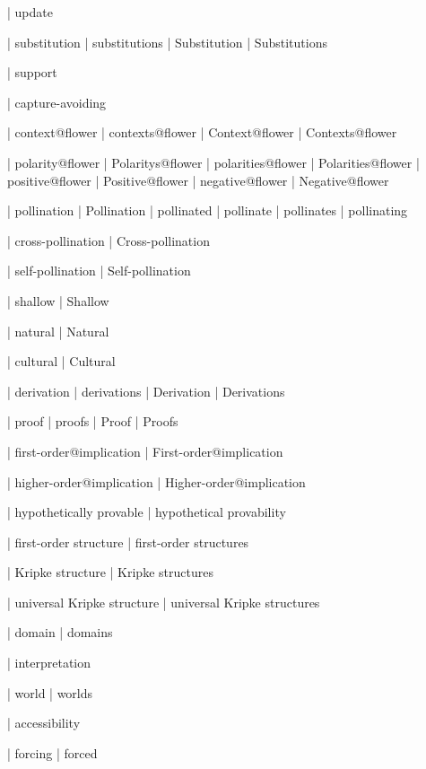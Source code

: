  | update

 | substitution
 | substitutions
 | Substitution
 | Substitutions

 | support

 | capture-avoiding

 | context@flower
 | contexts@flower
 | Context@flower
 | Contexts@flower

 | polarity@flower
 | Polaritys@flower
 | polarities@flower
 | Polarities@flower
 | positive@flower
 | Positive@flower
 | negative@flower
 | Negative@flower

 | pollination
 | Pollination
 | pollinated
 | pollinate
 | pollinates
 | pollinating

 | cross-pollination
 | Cross-pollination

 | self-pollination
 | Self-pollination

 | shallow
 | Shallow

 | natural
 | Natural

 | cultural
 | Cultural

 | derivation
 | derivations
 | Derivation
 | Derivations

 | proof
 | proofs
 | Proof
 | Proofs
 
 | first-order@implication
 | First-order@implication

 | higher-order@implication
 | Higher-order@implication

 | hypothetically provable
 | hypothetical provability

 | first-order structure
 | first-order structures

 | Kripke structure
 | Kripke structures

 | universal Kripke structure
 | universal Kripke structures

 | domain
 | domains

 | interpretation

 | world
 | worlds

 | accessibility

 | forcing
 | forced

